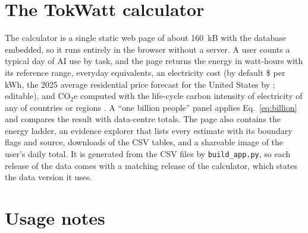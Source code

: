 \documentclass[11pt]{article}
\newcommand{\file}[1]{\texttt{#1}}
\begin{document}
\begin{table}[t]
  \centering
  \footnotesize
  \caption{Illustrative daily profiles scaled to one billion users with Eq.~\eqref{eq:billion}. $E$ uses the reference values and the range the reference ranges. Power and energy are the average draw and annual consumption for $10^9$ users; the last column compares that energy with the \gartnerTwhB~TWh projected for all data centres worldwide in 2026 \citep{gartner2026dc}.}
  \label{tab:profiles}
  
\end{table}

\section{The TokWatt calculator}
\label{sec:app}

The calculator is a single static web page of about 160~kB with the database embedded, so it runs entirely in the browser without a server. A user counts a typical day of AI use by task, and the page returns the energy in watt-hours with its reference range, everyday equivalents, an electricity cost (by default \$\priceUSD{} per kWh, the 2025 average residential price forecast for the United States by \citealp{hodge2025eia}; editable), and CO$_2$e computed with the life-cycle carbon intensity of electricity of any of \nGridCountries{} countries or \nGridRegions{} regions \citep{owid2026energy}. A ``one billion people'' panel applies Eq.~\eqref{eq:billion} and compares the result with data-centre totals. The page also contains the energy ladder, an evidence explorer that lists every estimate with its boundary flags and source, downloads of the CSV tables, and a shareable image of the user's daily total. It is generated from the CSV files by \file{build\_app.py}, so each release of the data comes with a matching release of the calculator, which states the data version it uses.

\section{Usage notes}
\label{sec:usage}
\end{document}
